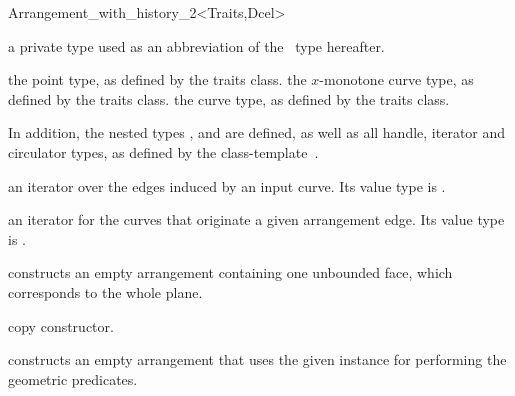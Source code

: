 \begin{ccRefClass}{Arrangement_with_history_2<Traits,Dcel>}
\ccInheritsFrom{}


\ccTypes

  {a private type used as an abbreviation of the \ccRefName\ type hereafter.}
  
\ccGlue
{}

  {the point type, as defined by the traits class.}
\ccGlue
{}
  {the $x$-monotone curve type, as defined by the traits class.}
\ccGlue
{}
  {the curve type, as defined by the traits class.}

In addition, the nested types ,  and 
are defined, as well as all handle, iterator and circulator types, as
defined by the 
class-template~.

\ccGlue
{}

       {an iterator over the edges induced by an input curve.
        Its value type is .}

    {an iterator for the curves that originate a given arrangement edge.
     Its value type is .}

\ccCreation
{}
    
    {constructs an empty arrangement containing one unbounded face,
     which corresponds to the
     whole plane.}
    
    {copy constructor.}
        
    {constructs an empty arrangement that uses the given 
     instance for performing the geometric predicates.}



\end{ccRefClass}
